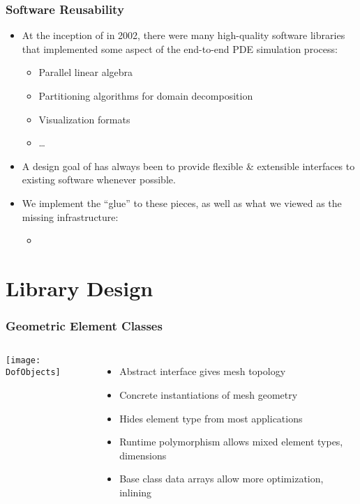 \frame
{
  \frametitle{Software Reusability}
  \begin{itemize}
    \item At the inception of \libMesh{} in 2002, there were many high-quality software libraries that implemented some aspect of the end-to-end PDE simulation process:
      \begin{itemize}
        \item Parallel linear algebra
        \item Partitioning algorithms for domain decomposition
        \item Visualization formats
        \item \ldots
      \end{itemize}
    \item A design goal of \libMesh{} has always been to provide flexible \& extensible interfaces to existing software whenever possible.
    \item We implement the ``glue'' to these pieces, as well as what we viewed as the missing infrastructure:
      \begin{itemize}
        \item {}
      \end{itemize}          
  \end{itemize}  
}


\section{Library Design}


\begin{frame}
\frametitle{Geometric Element Classes}

\begin{columns}
\begin{center}
\vspace{-5mm}
\texttt{[image: DofObjects]}
\end{center}
\begin{itemize}
\item Abstract interface gives mesh topology
\item Concrete instantiations of mesh geometry
\item Hides element type from most applications
\item Runtime polymorphism allows mixed element types, dimensions
\item Base class data arrays allow more optimization, inlining
\end{itemize}

\end{columns}

\end{frame}


